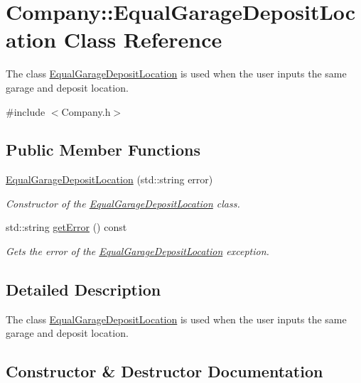 \hypertarget{class_company_1_1_equal_garage_deposit_location}{}\section{Company\+:\+:Equal\+Garage\+Deposit\+Location Class Reference}
\label{class_company_1_1_equal_garage_deposit_location}


The class \hyperlink{class_company_1_1_equal_garage_deposit_location}{Equal\+Garage\+Deposit\+Location} is used when the user inputs the same garage and deposit location.  




{\ttfamily \#include $<$Company.\+h$>$}

\subsection*{Public Member Functions}
\begin{DoxyCompactItemize}
\item 
\hyperlink{class_company_1_1_equal_garage_deposit_location_a7bb2855ee8652ac036e5fbaeafa5eaa0}{Equal\+Garage\+Deposit\+Location} (std\+::string error)
\begin{DoxyCompactList}\small\item\em Constructor of the \hyperlink{class_company_1_1_equal_garage_deposit_location}{Equal\+Garage\+Deposit\+Location} class. \end{DoxyCompactList}\item 
std\+::string \hyperlink{class_company_1_1_equal_garage_deposit_location_a85ad4b905cb216c9cdc5df006467145a}{get\+Error} () const 
\begin{DoxyCompactList}\small\item\em Gets the error of the \hyperlink{class_company_1_1_equal_garage_deposit_location}{Equal\+Garage\+Deposit\+Location} exception. \end{DoxyCompactList}\end{DoxyCompactItemize}


\subsection{Detailed Description}
The class \hyperlink{class_company_1_1_equal_garage_deposit_location}{Equal\+Garage\+Deposit\+Location} is used when the user inputs the same garage and deposit location. 

\subsection{Constructor \& Destructor Documentation}
